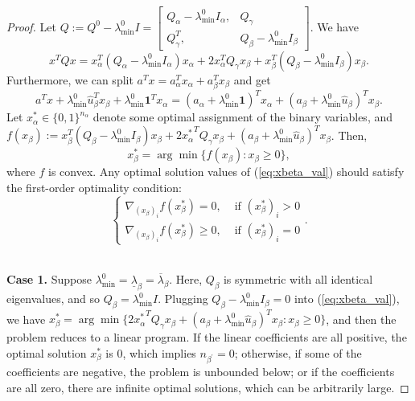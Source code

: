 \documentclass[]{article}
\begin{document}
\begin{proof}
    Let $Q:= Q^0-\lambda_{\min}^0I = \begin{bmatrix}
            Q_\alpha-\lambda_{\min}^0I_\alpha, &Q_\gamma \\
            Q_\gamma^T, &Q_\beta-\lambda_{\min}^0I_\beta
        \end{bmatrix}$. We have 
        \[x^TQx = x_\alpha^T (Q_\alpha -\lambda_{\min}^0I_\alpha) x_\alpha + 2x_\alpha^T Q_\gamma x_\beta + x_\beta^T (Q_\beta-\lambda_{\min}^0I_\beta)x_\beta.\]
        Furthermore, we can split $a^Tx = a^T_\alpha x_\alpha + a^T_\beta x_\beta$ and get
        \[a^Tx+\lambda_{\min}^0\hat{u}_\beta^Tx_\beta + \lambda_{\min}^0\mathbf{1}^T x_\alpha = (a_\alpha + \lambda_{\min}^0\mathbf{1})^Tx_\alpha + (a_\beta + \lambda_{\min}^0\hat{u}_\beta)^Tx_\beta.\]
        Let $x_\alpha^* \in\{0,1\}^{n_\alpha}$ denote some optimal assignment of the binary variables, and $f(x_\beta) := x_\beta^T (Q_\beta-\lambda_{\min}^0I_\beta)x_\beta +2{x_\alpha^*}^T Q_\gamma x_\beta + (a_\beta+\lambda_{\min}^0\hat{u}_\beta)^Tx_\beta$. Then, 
        \begin{equation}\label{eq:xbeta_val}
            x_\beta^* = \arg\min\{f(x_\beta): x_\beta\geq 0\},
        \end{equation} 
        where $f$ is convex. Any optimal solution values of (\ref{eq:xbeta_val})  should satisfy the first-order optimality condition:
        \begin{equation}\label{eq:opt_condition_2}
            \left\{ \begin{aligned}
            \nabla_{(x_\beta)_i}f(x^*_\beta) = 0, &\mbox{ if } (x^*_\beta)_i > 0\\
            \nabla_{(x_\beta)_i}f(x^*_\beta) \geq 0, &\mbox{ if } (x^*_\beta)_i = 0
            \end{aligned}\right. .
        \end{equation}
        
        ~\\
        \textbf{Case 1.} Suppose $\lambda_{\min}^0 = \underline{\lambda}_\beta =\overline{\lambda}_\beta$. Here, $Q_\beta$ is symmetric with all identical eigenvalues, and so $Q_\beta = \lambda_{\min}^0I$. Plugging $Q_\beta-\lambda_{\min}^0I_\beta = 0$ into (\ref{eq:xbeta_val}), we have $x_\beta^* = \arg\min\{2{x_\alpha^*}^T Q_\gamma x_\beta + (a_\beta + \lambda_{\min}^0\hat{u}_\beta)^Tx_\beta : x_\beta \geq 0\}$, and then the problem reduces to a linear program. If the linear coefficients are all positive, the optimal solution $x_\beta^*$ is 0, which implies $n_{\beta^\prime} = 0$; otherwise, if some of the coefficients are negative, the problem is unbounded below; or if the coefficients are all zero, there are infinite optimal solutions, which can be arbitrarily large.
        

\end{proof}
\end{document}
